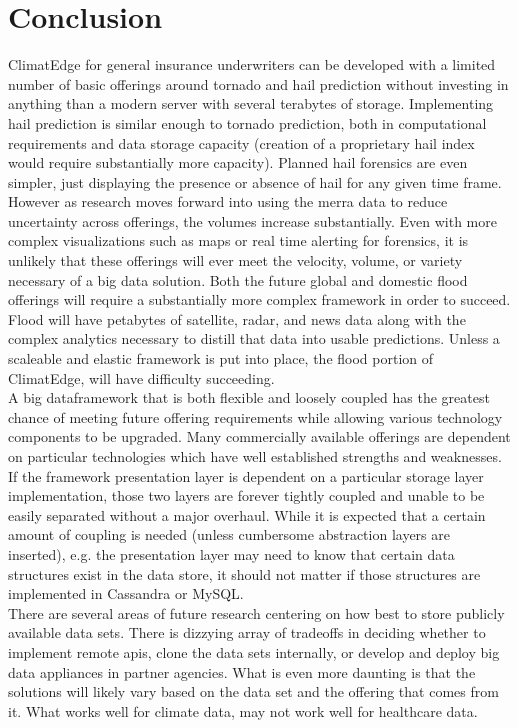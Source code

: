 \section{Conclusion}
ClimatEdge\texttrademark{} for general insurance underwriters can be developed with a limited number of basic offerings around tornado and hail prediction without investing in anything than a modern server with several terabytes of storage. Implementing hail prediction is similar enough to tornado prediction, both in computational requirements and data storage capacity (creation of a proprietary hail index would require substantially more capacity). Planned hail forensics are even simpler, just displaying the presence or absence of hail for any given time frame. However as research moves forward into using the \gls{merra} data to reduce uncertainty across offerings, the volumes increase substantially. Even with more complex visualizations such as maps or real time alerting for forensics, it is unlikely that these offerings will ever meet the velocity, volume, or variety necessary of a big data solution. Both the future global and domestic flood offerings will require a substantially more complex framework in order to succeed. Flood will have petabytes of satellite, radar, and news data along with the complex analytics necessary to distill that data into usable predictions. Unless a scaleable and elastic framework is put into place, the flood portion of ClimatEdge\texttrademark{}, will have difficulty succeeding.\\

A big dataframework that is both flexible and loosely coupled has the greatest chance of meeting future offering requirements while allowing various technology components to be upgraded. Many commercially available offerings are dependent on particular technologies which have well established strengths and weaknesses. If the framework presentation layer is dependent on a particular storage layer implementation, those two layers are forever tightly coupled and unable to be easily separated without a major overhaul. While it is expected that a certain amount of coupling is needed (unless cumbersome abstraction layers are inserted), e.g. the presentation layer may need to know that certain data structures exist in the data store, it should not matter if those structures are implemented in Cassandra or MySQL.\\

There are several areas of future research centering on how best to store publicly available data sets. There is dizzying array of tradeoffs in deciding whether to implement remote \gls{api}s, clone the data sets internally, or develop and deploy big data appliances in partner agencies. What is even more daunting is that the solutions will likely vary based on the data set and the offering that comes from it. What works well for climate data, may not work well for healthcare data.\\
